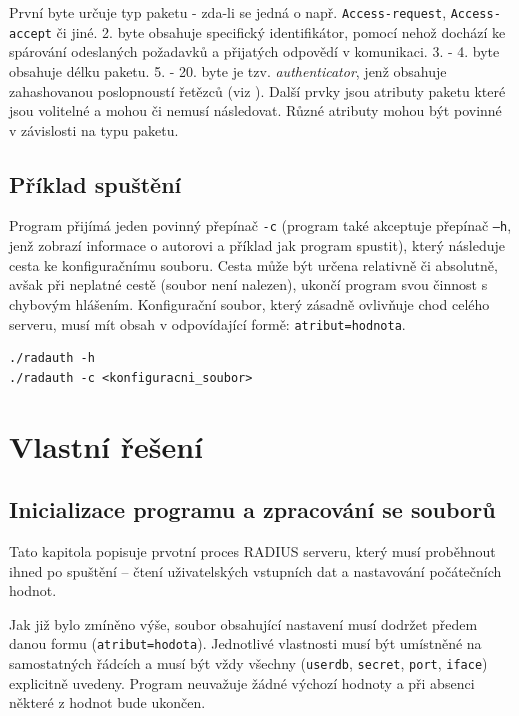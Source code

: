\documentclass[12pt,a4paper,titlepage,final]{article}
\begin{document}
První byte určuje typ paketu - zda-li se jedná o např. \texttt{Access-request}, \texttt{Access-accept} či jiné. 2. byte obsahuje specifický identifikátor, pomocí nehož dochází ke spárování odeslaných požadavků a přijatých odpovědí v komunikaci.  3. - 4. byte obsahuje délku paketu. 5. - 20. byte je tzv. \textit{authenticator}, jenž obsahuje zahashovanou poslopnoustí řetězců (viz \cite{rfc2865}). Další prvky jsou atributy paketu které jsou volitelné a mohou či nemusí následovat. Různé atributy mohou být povinné v závislosti na typu paketu. 

\subsection{Příklad spuštění}


Program přijímá jeden povinný přepínač \texttt{-c} (program také akceptuje přepínač \texttt{–h}, jenž zobrazí informace o autorovi a příklad jak program spustit), který následuje cesta ke konfiguračnímu souboru. Cesta může být určena relativně či absolutně, avšak při neplatné cestě (soubor není nalezen), ukončí program svou činnost s chybovým hlášením. Konfigurační soubor, který zásadně ovlivňuje chod celého serveru, musí mít obsah v odpovídající formě: \texttt{atribut=hodnota}.
\begin{lstlisting}
./radauth -h
./radauth -c <konfiguracni_soubor>
\end{lstlisting}



\section{Vlastní řešení} \label{mojereseni}

\subsection{Inicializace programu a zpracování se souborů}
Tato kapitola popisuje prvotní proces RADIUS serveru, který musí proběhnout ihned po spuštění – čtení uživatelských vstupních dat a nastavování počátečních hodnot.

Jak již bylo zmíněno výše, soubor obsahující nastavení musí dodržet předem danou formu (\texttt{atribut=hodota}). Jednotlivé vlastnosti musí být umístněné na samostatných řádcích a musí být vždy všechny (\texttt{userdb}, \texttt{secret}, \texttt{port}, \texttt{iface}) explicitně uvedeny. Program neuvažuje žádné výchozí hodnoty a při absenci některé z hodnot bude ukončen.
\end{document}
